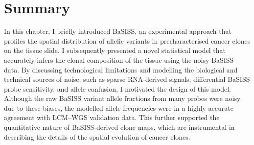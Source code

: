 \section{Summary}

In this chapter, I briefly introduced \acf{BaSISS}, an experimental approach that profiles the spatial distribution of allelic variants in precharacterised cancer clones on the tissue slide. I subsequently presented a novel statistical model that accurately infers the clonal composition of the tissue using the noisy \ac{BaSISS} data. By discussing technological limitations and modelling the biological and technical sources of noise, such as sparse RNA-derived signals, differential \ac{BaSISS} probe sensitivity, and allele confusion, I motivated the design of this model. Although the raw \ac{BaSISS} variant allele fractions from many probes were noisy due to these biases, the modelled allele frequencies were in a highly accurate agreement with \ac{LCM}–\ac{WGS} validation data. This further supported the quantitative nature of \ac{BaSISS}-derived clone maps, which are instrumental in describing the details of the spatial evolution of cancer clones. 